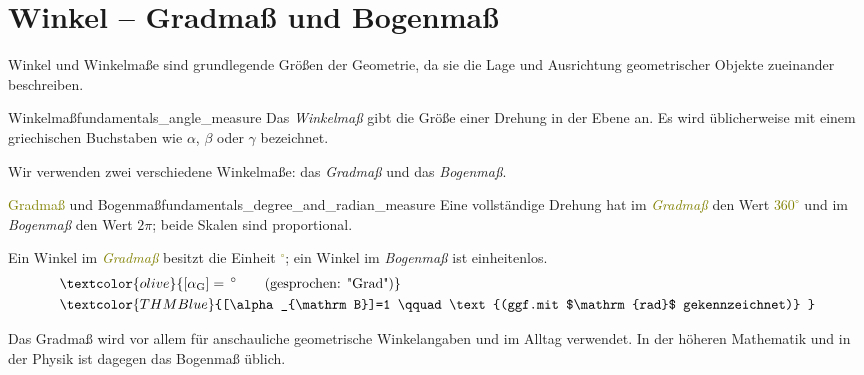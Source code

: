 \section{Winkel -- Gradmaß und Bogenmaß}
\label{sec:fundamentals_angle_measures}

Winkel und Winkelmaße sind grundlegende Größen der Geometrie, da sie die Lage und
Ausrichtung geometrischer Objekte zueinander beschreiben.

\begin{DefinitionBox}{Winkelmaß}{fundamentals_angle_measure}
  Das \emph{Winkelmaß}  gibt die Größe einer Drehung in der Ebene an.
  Es wird üblicherweise mit einem griechischen Buchstaben wie $\alpha$, $\beta$ oder $\gamma$ bezeichnet.

  \begin{center}
    
  \end{center}
\end{DefinitionBox}

Wir verwenden zwei verschiedene Winkelmaße: das \emph{Gradmaß} und das \emph{Bogenmaß}.

\begin{DefinitionBox}{\textcolor{olive}{Gradmaß} und
    \textcolor{THMBlue}{Bogenmaß}}{fundamentals_degree_and_radian_measure}
  Eine vollständige Drehung hat im \textcolor{olive}{\emph{Gradmaß}}
   den Wert \textcolor{olive}{$360^\circ$} und im
  \textcolor{THMBlue}{\emph{Bogenmaß}}  den Wert
  \textcolor{THMBlue}{$2\pi$}; beide Skalen sind proportional.

  \begin{center}
    
  \end{center}

  Ein Winkel im \textcolor{olive}{\emph{Gradmaß}} besitzt die Einheit
  \textcolor{olive}{$^\circ$}; ein Winkel im
  \textcolor{THMBlue}{\emph{Bogenmaß}} ist einheitenlos.
  \begin{align*}
    &\textcolor{olive}{[\alpha_{\mathrm G}]=\,{}^\circ   \qquad \text{(gesprochen: "Grad")} } \\
    &\textcolor{THMBlue}{[\alpha_{\mathrm B}]=1          \qquad \text{(ggf.mit $\mathrm{rad}$ gekennzeichnet)} }
  \end{align*}
\end{DefinitionBox}

Das Gradmaß wird vor allem für anschauliche geometrische Winkelangaben und im
Alltag verwendet. In der höheren Mathematik und in der Physik ist dagegen das
Bogenmaß üblich.

